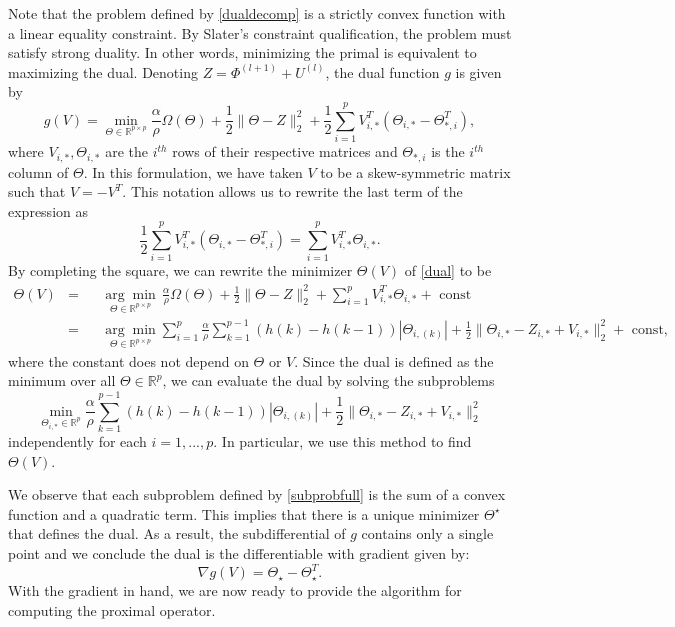 \documentclass{uwstat572}
\theoremstyle{remark}
\theoremstyle{definition}
\begin{document}
Note that the problem defined by \eqref{dualdecomp} is a strictly convex function with a linear equality constraint.  By Slater's constraint qualification, the problem must satisfy strong duality.  In other words, minimizing the primal is equivalent to maximizing the dual.  Denoting $Z = \Phi^{(l+1)} + U^{(l)}$, the dual function $g$ is given by
\begin{equation}\label{dual}
g(V) = \min_{\Theta \in \mathbb{R}^{p \times p} } \frac{\alpha}{\rho} \Omega(\Theta) + \frac{1}{2} \| \Theta - Z \|_2^2 + \frac{1}{2}\sum_{i=1}^p V_{i,*}^T ( \Theta_{i,*} - \Theta_{*, i}^T),
\end{equation}
where $V_{i,*}, \Theta_{i,*}$ are the $i^{th}$ rows of their respective matrices and $\Theta_{*,i}$ is the $i^{th}$ column of $\Theta$.  In this formulation, we have taken $V$ to be a skew-symmetric matrix such that $V = - V^T$.  This notation allows us to rewrite the last term of the expression as
\begin{equation*}
\frac{1}{2}\sum_{i=1}^p V_{i,*}^T ( \Theta_{i,*} - \Theta_{*, i}^T) = \sum_{i=1}^p V_{i,*}^T \Theta_{i,*}.
\end{equation*}
By completing the square, we can rewrite the minimizer $\Theta(V)$ of \eqref{dual} to be
\begin{equation*}
\begin{aligned}
\Theta(V) &= && \underset{\Theta \in \mathbb{R}^{p \times p}}{\arg\min} \, \frac{\alpha}{\rho} \Omega(\Theta) + \frac{1}{2} \| \Theta - Z \|_2^2 + \sum_{i=1}^p V_{i,*}^T \Theta_{i,*} + {\text{ const}}
\\
&= &&  \underset{\Theta \in \mathbb{R}^{p \times p}}{\arg\min} \sum_{i=1}^p \frac{\alpha}{\rho} \sum_{k=1}^{p-1} (h(k) - h(k-1)) |\Theta_{i,(k)}| + \frac{1}{2} \| \Theta_{i,*} - Z_{i,*} + V_{i,*} \|_2^2 + {\text{ const}},
\end{aligned}
\end{equation*}
where the constant does not depend on $\Theta$ or $V$.  Since the dual is defined as the minimum over all $\Theta \in \mathbb{R}^p$, we can evaluate the dual by solving the subproblems
\begin{equation}\label{subprobfull}
    \min_{\Theta_{i,*} \in \mathbb{R}^p} \frac{\alpha}{\rho} \sum_{k=1}^{p-1} (h(k) - h(k-1))|\Theta_{i,(k)}| + \frac{1}{2} \| \Theta_{i,*} - Z_{i,*} + V_{i,*} \|_2^2
\end{equation}
independently for each $i=1,...,p$.  In particular, we use this method to find $\Theta(V)$.

We observe that each subproblem defined by \eqref{subprobfull} is the sum of a convex function and a quadratic term.  This implies that there is a unique minimizer $\Theta^{\star}$ that defines the dual.  As a result, the subdifferential of $g$ contains only a single point and we conclude the dual is the differentiable with gradient given by:
\begin{equation*}\label{dualgrad}
\nabla g(V) = \Theta_{\star} - \Theta_{\star}^T.
\end{equation*}
With the gradient in hand, we are now ready to provide the algorithm for computing the proximal operator.
\end{document}
